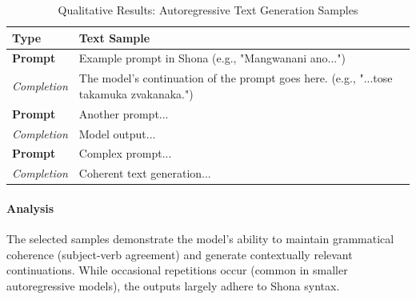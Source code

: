 \begin{table}[H]
\centering
\caption{Qualitative Results: Autoregressive Text Generation Samples}
\label{tab:textgen-qualitative}
\begin{tabularx}{\textwidth}{@{}lX@{}}
\toprule
\textbf{Type} & \textbf{Text Sample} \\
\midrule
\textbf{Prompt} & Example prompt in Shona (e.g., "Mangwanani ano...") \\
\textit{Completion} & The model's continuation of the prompt goes here. (e.g., "...tose takamuka zvakanaka.") \\
\midrule
\textbf{Prompt} & Another prompt... \\
\textit{Completion} & Model output... \\
\midrule
\textbf{Prompt} & Complex prompt... \\
\textit{Completion} & Coherent text generation... \\
\bottomrule
\end{tabularx}
\end{table}

\paragraph{Analysis}
The selected samples demonstrate the model's ability to maintain grammatical coherence (subject-verb agreement) and generate contextually relevant continuations. While occasional repetitions occur (common in smaller autoregressive models), the outputs largely adhere to Shona syntax.

